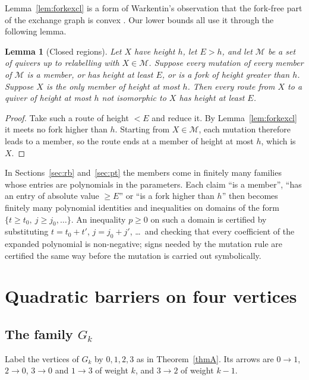 \documentclass[11pt]{amsart}
\newtheorem{lemma}[theorem]{Lemma}
\theoremstyle{definition}
\theoremstyle{remark}
\newcommand{\cM}{\mathcal{M}}
\begin{document}
Lemma~\ref{lem:forkexcl} is a form of Warkentin's observation that the fork-free part of the exchange graph is convex \cite[Cor.~4.5]{War}. Our lower bounds all use it through the following lemma.

\begin{lemma}[Closed regions]\label{lem:region}
Let $X$ have height $h$, let $E>h$, and let $\cM$ be a set of quivers up to relabelling with $X\in\cM$. Suppose every mutation of every member of $\cM$ is a member, or has height at least $E$, or is a fork of height greater than $h$. Suppose $X$ is the only member of height at most $h$. Then every route from $X$ to a quiver of height at most $h$ not isomorphic to $X$ has height at least $E$.
\end{lemma}
\begin{proof}
Take such a route of height $<E$ and reduce it. By Lemma~\ref{lem:forkexcl} it meets no fork higher than $h$. Starting from $X\in\cM$, each mutation therefore leads to a member, so the route ends at a member of height at most $h$, which is $X$.
\end{proof}

In Sections~\ref{sec:rb} and~\ref{sec:pt} the members come in finitely many families whose entries are polynomials in the parameters. Each claim ``is a member'', ``has an entry of absolute value $\ge E$'' or ``is a fork higher than $h$'' then becomes finitely many polynomial identities and inequalities on domains of the form $\{t\ge t_0,\ j\ge j_0,\dots\}$. An inequality $p\ge0$ on such a domain is certified by substituting $t=t_0+t'$, $j=j_0+j'$, \dots\ and checking that every coefficient of the expanded polynomial is non-negative; signs needed by the mutation rule are certified the same way before the mutation is carried out symbolically.

\section{Quadratic barriers on four vertices}\label{sec:four}

\subsection{The family \texorpdfstring{$G_k$}{G\_k}}\label{sec:gk}
Label the vertices of $G_k$ by $0,1,2,3$ as in Theorem~\ref{thmA}. Its arrows are $0\to1$, $2\to0$, $3\to0$ and $1\to3$ of weight $k$, and $3\to2$ of weight $k-1$.
\end{document}
